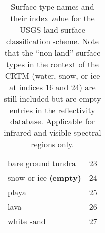 \begin{table}[htp]
\begin{tabular}{p{7cm} c}
    bare ground tundra                           & 23  \\
    snow or ice \textbf{(empty)}                 & 24  \\
    playa                                        & 25  \\
    lava                                         & 26  \\
    white sand                                   & 27  \\
    \hline
  \end{tabular}
  \caption{Surface type names and their index value for the USGS land surface classification scheme. Note that the ``non-land'' surface types in the context of the CRTM (water, snow, or ice at indices 16 and 24) are still included but are empty entries in the reflectivity database. Applicable for infrared and visible spectral regions only.}
  \label{tab:usgs_surface_type_classifications}
\end{table}

